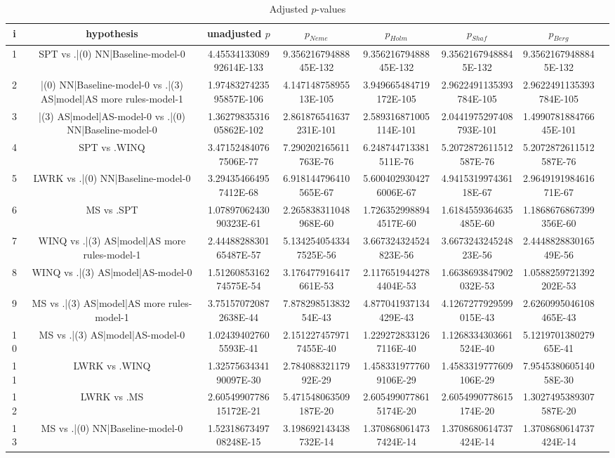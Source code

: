 \documentclass[a3paper,10pt]{article}
\begin{document}
\begin{table}[!htp]
\centering\tiny
\caption{Adjusted $p$-values}
\begin{tabular}{cccccccc}
i&hypothesis&unadjusted $p$&$p_{Neme}$&$p_{Holm}$&$p_{Shaf}$&$p_{Berg}$\\
\hline
1&SPT vs .|(0) NN|Baseline-model-0&4.4553413308992614E-133&9.35621679488845E-132&9.35621679488845E-132&9.35621679488845E-132&9.35621679488845E-132\\
2&|(0) NN|Baseline-model-0 vs .|(3) AS|model|AS more rules-model-1&1.9748327423595857E-106&4.14714875895513E-105&3.949665484719172E-105&2.9622491135393784E-105&2.9622491135393784E-105\\
3&|(3) AS|model|AS-model-0 vs .|(0) NN|Baseline-model-0&1.3627983531605862E-102&2.861876541637231E-101&2.589316871005114E-101&2.0441975297408793E-101&1.499078188476645E-101\\
4&SPT vs .WINQ&3.471524840767506E-77&7.290202165611763E-76&6.248744713381511E-76&5.2072872611512587E-76&5.2072872611512587E-76\\
5&LWRK vs .|(0) NN|Baseline-model-0&3.294354664957412E-68&6.918144796410565E-67&5.6004029304276006E-67&4.941531997436118E-67&2.964919198461671E-67\\
6&MS vs .SPT&1.0789706243090323E-61&2.265838311048968E-60&1.7263529988944517E-60&1.6184559364635485E-60&1.1868676867399356E-60\\
7&WINQ vs .|(3) AS|model|AS more rules-model-1&2.4448828830165487E-57&5.1342540543347525E-56&3.667324324524823E-56&3.667324324524823E-56&2.444882883016549E-56\\
8&WINQ vs .|(3) AS|model|AS-model-0&1.5126085316274575E-54&3.176477916417661E-53&2.1176519442784404E-53&1.6638693847902032E-53&1.0588259721392202E-53\\
9&MS vs .|(3) AS|model|AS more rules-model-1&3.751570720872638E-44&7.87829851383254E-43&4.877041937134429E-43&4.1267277929599015E-43&2.6260995046108465E-43\\
10&MS vs .|(3) AS|model|AS-model-0&1.024394027605593E-41&2.1512274579717455E-40&1.2292728331267116E-40&1.1268334303661524E-40&5.121970138027965E-41\\
11&LWRK vs .WINQ&1.3257563434190097E-30&2.78408832117992E-29&1.4583319777609106E-29&1.4583319777609106E-29&7.954538060514058E-30\\
12&LWRK vs .MS&2.6054990778615172E-21&5.471548063509187E-20&2.6054990778615174E-20&2.6054990778615174E-20&1.3027495389307587E-20\\
13&MS vs .|(0) NN|Baseline-model-0&1.5231867349708248E-15&3.198692143438732E-14&1.3708680614737424E-14&1.3708680614737424E-14&1.3708680614737424E-14\\

\end{tabular}
\end{table}
\end{document}
